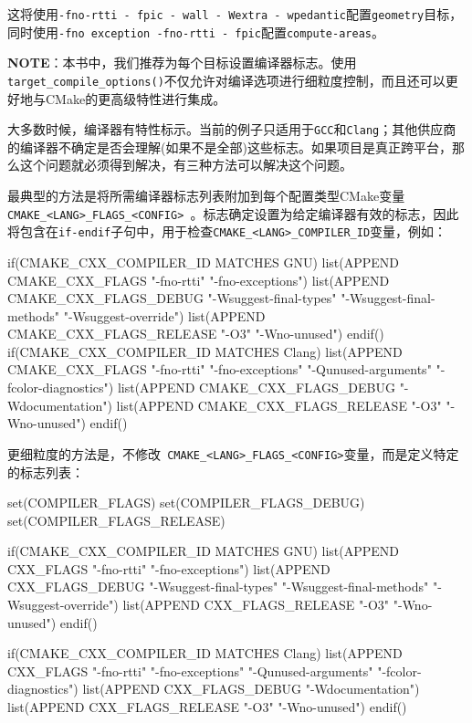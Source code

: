 这将使用\texttt{-fno-rtti - fpic - wall - Wextra - wpedantic}配置\texttt{geometry}目标，同时使用\texttt{-fno exception -fno-rtti - fpic}配置\texttt{compute-areas}。

\begin{myInfoBox}
\textbf{NOTE}：本书中，我们推荐为每个目标设置编译器标志。使用\texttt{target\_compile\_options()}不仅允许对编译选项进行细粒度控制，而且还可以更好地与CMake的更高级特性进行集成。
\end{myInfoBox}


大多数时候，编译器有特性标示。当前的例子只适用于\texttt{GCC}和\texttt{Clang}；其他供应商的编译器不确定是否会理解(如果不是全部)这些标志。如果项目是真正跨平台，那么这个问题就必须得到解决，有三种方法可以解决这个问题。

最典型的方法是将所需编译器标志列表附加到每个配置类型CMake变量\texttt{CMAKE\_<LANG>\_FLAGS\_<CONFIG> }。标志确定设置为给定编译器有效的标志，因此将包含在\texttt{if-endif}子句中，用于检查\texttt{CMAKE\_<LANG>\_COMPILER\_ID}变量，例如：

\begin{codebox}[cmake]
if(CMAKE_CXX_COMPILER_ID MATCHES GNU)
  list(APPEND CMAKE_CXX_FLAGS "-fno-rtti" "-fno-exceptions")
  list(APPEND CMAKE_CXX_FLAGS_DEBUG "-Wsuggest-final-types" "-Wsuggest-final-methods" "-Wsuggest-override")
  list(APPEND CMAKE_CXX_FLAGS_RELEASE "-O3" "-Wno-unused")
endif()
if(CMAKE_CXX_COMPILER_ID MATCHES Clang)
  list(APPEND CMAKE_CXX_FLAGS "-fno-rtti" "-fno-exceptions" "-Qunused-arguments" "-fcolor-diagnostics")
  list(APPEND CMAKE_CXX_FLAGS_DEBUG "-Wdocumentation")
  list(APPEND CMAKE_CXX_FLAGS_RELEASE "-O3" "-Wno-unused")
endif()
\end{codebox}

更细粒度的方法是，不修改\texttt{ CMAKE\_<LANG>\_FLAGS\_<CONFIG>}变量，而是定义特定的标志列表：

\begin{codebox}[cmake]
set(COMPILER_FLAGS)
set(COMPILER_FLAGS_DEBUG)
set(COMPILER_FLAGS_RELEASE)

if(CMAKE_CXX_COMPILER_ID MATCHES GNU)
  list(APPEND CXX_FLAGS "-fno-rtti" "-fno-exceptions")
  list(APPEND CXX_FLAGS_DEBUG "-Wsuggest-final-types" "-Wsuggest-final-methods" "-Wsuggest-override")
  list(APPEND CXX_FLAGS_RELEASE "-O3" "-Wno-unused")
endif()

if(CMAKE_CXX_COMPILER_ID MATCHES Clang)
  list(APPEND CXX_FLAGS "-fno-rtti" "-fno-exceptions" "-Qunused-arguments" "-fcolor-diagnostics")
  list(APPEND CXX_FLAGS_DEBUG "-Wdocumentation")
  list(APPEND CXX_FLAGS_RELEASE "-O3" "-Wno-unused")
endif()
\end{codebox}


